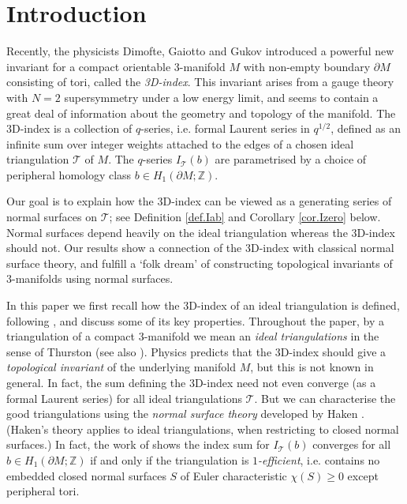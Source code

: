 \documentclass[12pt,reqno]{amsart}  %
\theoremstyle{definition}
\theoremstyle{remark}
\def\tri{\mathcal{T}}
\newcommand{\CT}{\mathcal{T}}
\def\Z{\mathbb Z}
\def\bd{\partial}
\begin{document}
\section{Introduction}  

Recently, the physicists Dimofte, Gaiotto and Gukov \cite{DGG1,DGG2}
introduced a powerful new invariant for a compact orientable 3-manifold $M$ 
with non-empty boundary $\bd M$ consisting of tori, called the 
\emph{3D-index}. This invariant arises from a gauge theory with $N=2$ 
supersymmetry under a low energy limit, and seems to contain a great deal 
of information about the geometry and topology of the manifold. The 
3D-index is a collection of $q$-series, i.e. formal Laurent series in 
$q^{1/2}$, defined as an infinite sum over integer weights attached to 
the edges of a chosen ideal triangulation $\CT$ of $M$. The $q$-series 
$I_\CT(b)$ are parametrised by a choice of peripheral homology class 
$b \in H_1(\bd M;\Z)$.

 Our goal is to explain how the 3D-index can be viewed as a generating
series of normal surfaces on $\CT$; see Definition \ref{def.Iab} and
Corollary \ref{cor.Izero} below. Normal surfaces depend heavily
on the ideal triangulation whereas the 3D-index should not. Our results
show a connection of the 3D-index with classical normal surface theory, 
and fulfill a `folk dream' of constructing topological invariants of 
3-manifolds using normal surfaces. 

In this paper we first recall how the 3D-index of an ideal triangulation 
is defined, following \cite{GHRS}, and discuss some of its key properties. 
Throughout the paper, by a triangulation of a compact 3-manifold we mean an 
{\em ideal triangulations} in the sense of Thurston \cite{Th} 
(see also \cite{NZ,N}). 
Physics predicts that 
the 3D-index should give a {\em topological invariant} of the underlying 
manifold $M$, but this is not known in general. In fact, the sum defining 
the 3D-index need not even converge (as a formal Laurent series) for all 
ideal triangulations $\tri$.  But we can characterise the good 
triangulations using the {\em normal surface theory} developed by Haken 
\cite{Ha1,Ha2}. (Haken's theory applies to ideal triangulations, when 
restricting to closed normal surfaces.) 
In fact, the work of \cite{GHRS} shows the index sum 
for $I_\CT(b)$ converges for all $b \in H_1(\bd M;\Z)$ if and only
if the triangulation is {\em $1$-efficient}, i.e. contains no embedded 
closed normal surfaces $S$ of Euler characteristic $\chi(S) \ge 0$ 
except peripheral tori. 
\end{document}
